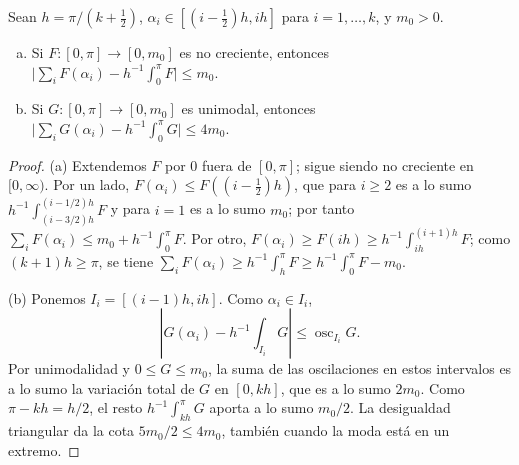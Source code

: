 \begin{lema}\label{lem:torres-riemann}
Sean $h=\pi/(k+\frac12)$, $\alpha_i\in[(i-\frac12)h,ih]$ para $i=1,\dots,k$, y $m_0>0$.
\begin{enumerate}[(a)]
\item Si $F:[0,\pi]\to[0,m_0]$ es no creciente, entonces
 $\bigl|\sum_iF(\alpha_i)-h^{-1}\int_0^\pi F\bigr|\le m_0$.
\item Si $G:[0,\pi]\to[0,m_0]$ es unimodal, entonces
 $\bigl|\sum_iG(\alpha_i)-h^{-1}\int_0^\pi G\bigr|\le4m_0$.
\end{enumerate}
\end{lema}
\begin{proof}
(a) Extendemos $F$ por $0$ fuera de $[0,\pi]$; sigue siendo no creciente en $[0,\infty)$. Por un lado,
$F(\alpha_i)\le F((i-\frac12)h)$, que para $i\ge2$ es a lo sumo $h^{-1}\int_{(i-3/2)h}^{(i-1/2)h}F$ y para
$i=1$ es a lo sumo $m_0$; por tanto $\sum_iF(\alpha_i)\le m_0+h^{-1}\int_0^\pi F$. Por otro,
$F(\alpha_i)\ge F(ih)\ge h^{-1}\int_{ih}^{(i+1)h}F$; como $(k+1)h\ge\pi$, se tiene
$\sum_iF(\alpha_i)\ge h^{-1}\int_h^\pi F\ge h^{-1}\int_0^\pi F-m_0$.

(b) Ponemos $I_i=[(i-1)h,ih]$. Como $\alpha_i\in I_i$,
\[
 \left|G(\alpha_i)-h^{-1}\int_{I_i}G\right|
 \le\operatorname{osc}_{I_i}G .
\]
Por unimodalidad y $0\le G\le m_0$, la suma de las oscilaciones en estos intervalos
es a lo sumo la variación total de $G$ en $[0,kh]$, que es a lo sumo $2m_0$.
Como $\pi-kh=h/2$, el resto $h^{-1}\int_{kh}^{\pi}G$ aporta a lo sumo $m_0/2$.
La desigualdad triangular da la cota $5m_0/2\le4m_0$, también cuando la moda está en un extremo.
\end{proof}
